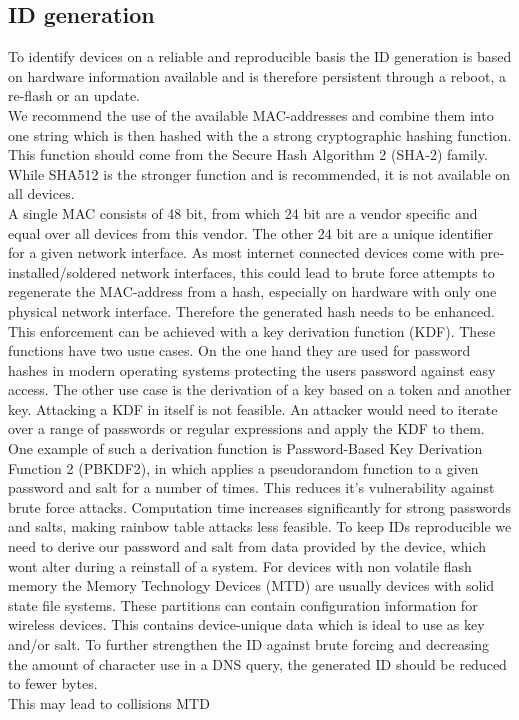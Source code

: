     \subsection{ID generation}
        \label{subsec:software_design:id}
        To identify devices on a reliable and reproducible basis the ID generation is based on hardware information available and is therefore persistent through a reboot, a re-flash or an update.\\
        We recommend the use of the available MAC-addresses and combine them into one string which is then hashed with the a strong cryptographic hashing function.
        This function should come from the Secure Hash Algorithm 2 (SHA-2) family. While SHA512 is the stronger function and is recommended, it is not available on all devices.\\
        A single MAC consists of 48 bit, from which 24 bit are a vendor specific and equal over all devices from this vendor. The other 24 bit are a unique identifier for a given network interface. As most internet connected devices come with pre-installed/soldered network interfaces, this could lead to brute force attempts to regenerate the MAC-address from a hash, especially on hardware with only one physical network interface. Therefore the generated hash needs to be enhanced.\\
        This enforcement can be achieved with a key derivation function (KDF). These functions have two usue cases. On the one hand they are used for password hashes in modern operating systems protecting the users password against easy access\cite{percival_stronger_nodate}. 
        The other use case is the derivation of a key based on a token and another key\cite{camenisch_privacy_2011}. Attacking a KDF in itself is not feasible. An attacker would need to iterate over a range of passwords or regular expressions and apply the KDF to them\cite{percival_stronger_nodate}.
        One example of such a derivation function is Password-Based Key Derivation Function 2 (PBKDF2), in which applies a pseudorandom function to a given password and salt for a number of times. This reduces it's vulnerability against brute force attacks\cite{kaliski_bkaliskirsasecuritycom_pkcs_2000}. 
        Computation time increases significantly for strong passwords and salts, making rainbow table attacks less feasible. 
        To keep IDs reproducible we need to derive our password and salt from data provided by the device, which wont alter during a reinstall of a system. For devices with non volatile flash memory the Memory Technology Devices (MTD) are usually devices with solid state file systems\cite{giometti_mtd_2017}. These partitions can contain configuration information for wireless devices. This contains device-unique data which is ideal to use as key and/or salt.
        To further strengthen the ID against brute forcing and decreasing the amount of character use in a DNS query, the generated ID should be reduced to fewer bytes.\\
        This may lead to collisions
        MTD \cite{woodhouse_memory_nodate}
\newpage



